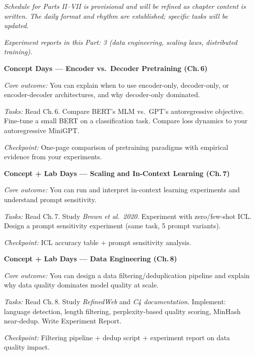 \medskip
\noindent\textit{Schedule for Parts II--VII is provisional and will be refined as chapter content is written. The daily format and rhythm are established; specific tasks will be updated.}

\medskip
\noindent\textit{Experiment reports in this Part: 3 (data engineering, scaling laws, distributed training).}

\begin{description}[style=nextline, leftmargin=1.8cm, labelwidth=1.5cm]

\item[Day 13--14] \textbf{Concept Days --- Encoder vs.\ Decoder Pretraining (Ch.\,6)}

\textit{Core outcome:} You can explain when to use encoder-only, decoder-only, or encoder-decoder architectures, and why decoder-only dominated.

\textit{Tasks:} Read Ch.\,6. Compare BERT's MLM vs.\ GPT's autoregressive objective. Fine-tune a small BERT on a classification task. Compare loss dynamics to your autoregressive MiniGPT.

\textit{Checkpoint:} One-page comparison of pretraining paradigms with empirical evidence from your experiments.

\item[Day 15--16] \textbf{Concept + Lab Days --- Scaling and In-Context Learning (Ch.\,7)}

\textit{Core outcome:} You can run and interpret in-context learning experiments and understand prompt sensitivity.

\textit{Tasks:} Read Ch.\,7. Study \emph{Brown et al.\ 2020}. Experiment with zero/few-shot ICL. Design a prompt sensitivity experiment (same task, 5 prompt variants).

\textit{Checkpoint:} ICL accuracy table + prompt sensitivity analysis.

\item[Day 17--19] \textbf{Concept + Lab Days --- Data Engineering (Ch.\,8)}

\textit{Core outcome:} You can design a data filtering/deduplication pipeline and explain why data quality dominates model quality at scale.

\textit{Tasks:} Read Ch.\,8. Study \emph{RefinedWeb} and \emph{C4 documentation}. Implement: language detection, length filtering, perplexity-based quality scoring, MinHash near-dedup. Write Experiment Report.

\textit{Checkpoint:} Filtering pipeline + dedup script + experiment report on data quality impact.


\end{description}
